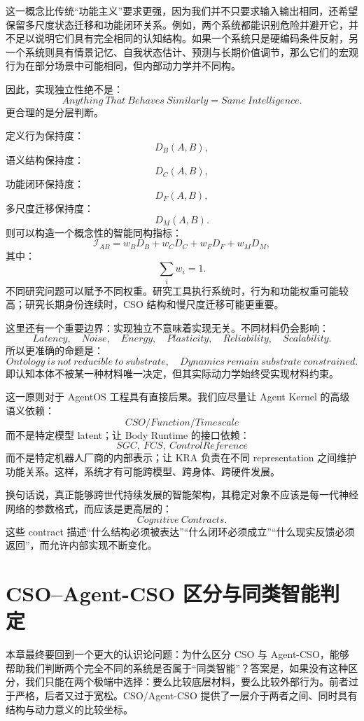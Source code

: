 这一概念比传统“功能主义”要求更强，因为我们并不只要求输入输出相同，还希望保留多尺度状态迁移和功能闭环关系。例如，两个系统都能识别危险并避开它，并不足以说明它们具有完全相同的认知结构。如果一个系统只是硬编码条件反射，另一个系统则具有情景记忆、自我状态估计、预测与长期价值调节，那么它们的宏观行为在部分场景中可能相同，但内部动力学并不同构。

因此，实现独立性绝不是：
\[
Anything\ That\ Behaves\ Similarly
=
Same\ Intelligence.
\]
更合理的是分层判断。

定义行为保持度：
\[
D_B(A,B),
\]
语义结构保持度：
\[
D_C(A,B),
\]
功能闭环保持度：
\[
D_F(A,B),
\]
多尺度迁移保持度：
\[
D_M(A,B).
\]
则可以构造一个概念性的智能同构指标：
\[
\mathcal I_{AB}
=
w_BD_B
+
w_CD_C
+
w_FD_F
+
w_MD_M,
\]
其中：
\[
\sum_i w_i=1.
\]
不同研究问题可以赋予不同权重。研究工具执行系统时，行为和功能权重可能较高；研究长期身份连续时，CSO 结构和慢尺度迁移可能更重要。

这里还有一个重要边界：实现独立不意味着实现无关。不同材料仍会影响：
\[
Latency,
\quad
Noise,
\quad
Energy,
\quad
Plasticity,
\quad
Reliability,
\quad
Scalability.
\]
所以更准确的命题是：
\[
\boxed{
Ontology\ is\ not\ reducible\ to\ substrate,
\quad
Dynamics\ remain\ substrate\ constrained.
}
\]
即认知本体不被某一种材料唯一决定，但其实际动力学始终受实现材料约束。

这一原则对于 AgentOS 工程具有直接后果。我们应尽量让 Agent Kernel 的高级语义依赖：
\[
CSO/Function/Timescale
\]
而不是特定模型 latent；让 Body Runtime 的接口依赖：
\[
SGC,\ FCS,\ ControlReference
\]
而不是特定机器人厂商的内部表示；让 KRA 负责在不同 representation 之间维护功能关系。这样，系统才有可能跨模型、跨身体、跨硬件发展。

换句话说，真正能够跨世代持续发展的智能架构，其稳定对象不应该是每一代神经网络的参数格式，而应该是更高层的：
\[
\boxed{
Cognitive\ Contracts.
}
\]
这些 contract 描述“什么结构必须被表达”“什么闭环必须成立”“什么现实反馈必须返回”，而允许内部实现不断变化。

\section{CSO--Agent-CSO 区分与同类智能判定}

本章最终要回到一个更大的认识论问题：为什么区分 CSO 与 Agent-CSO，能够帮助我们判断两个完全不同的系统是否属于“同类智能”？答案是，如果没有这种区分，我们只能在两个极端中选择：要么比较底层材料，要么比较外部行为。前者过于严格，后者又过于宽松。CSO/Agent-CSO 提供了一层介于两者之间、同时具有结构与动力意义的比较坐标。

